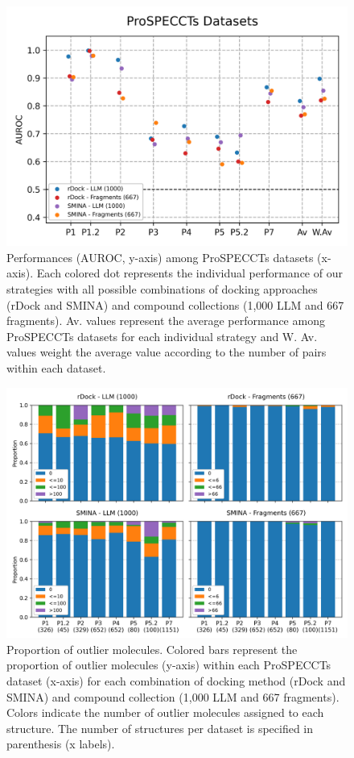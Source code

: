 \begin{figure}[htbp]
  \centering
  \includegraphics[width=0.65\linewidth]{figures/PocketVec/Supplementary/FigS4.png}
  \caption{
  Performances (AUROC, y-axis) among ProSPECCTs datasets (x-axis). Each colored dot represents the individual performance of our strategies with all possible combinations of docking approaches (rDock and SMINA) and compound collections (1,000 LLM and 667 fragments). Av. values represent the average performance among ProSPECCTs datasets for each individual strategy and W. Av. values weight the average value according to the number of pairs within each dataset.
  }
  \label{FigS4}
\end{figure}


\begin{figure}[htbp]
  \centering
  \includegraphics[width=0.75\linewidth]{figures/PocketVec/Supplementary/FigS5.png}
  \caption{
  Proportion of outlier molecules. Colored bars represent the proportion of outlier molecules (y-axis) within each ProSPECCTs dataset (x-axis) for each combination of docking method (rDock and SMINA) and compound collection (1,000 LLM and 667 fragments). Colors indicate the number of outlier molecules assigned to each structure. The number of structures per dataset is specified in parenthesis (x labels).
  }
  \label{FigS5}
\end{figure}

